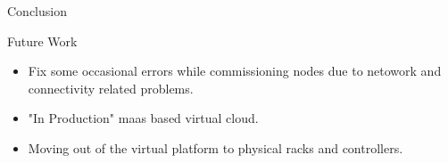 \begin{frame}{Conclusion}
    \begin{block}{Future Work}
        \begin{itemize}
            \item Fix some occasional errors while commissioning nodes due to netowork and connectivity related problems.
            \item "In Production" maas based virtual cloud.
            \item Moving out of the virtual platform to physical racks and controllers.
        \end{itemize}
    \end{block}
\end{frame}